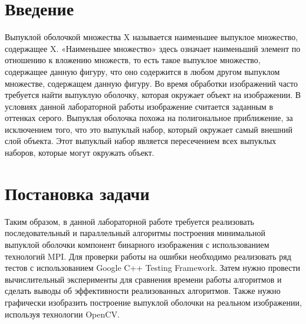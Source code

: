 \documentclass{report}
\begin{document}
\setcounter{page}{2}

\tableofcontents
\newpage

\section*{Введение}
\par Выпуклой оболочкой множества X называется наименьшее выпуклое множество, содержащее X. «Наименьшее множество» здесь означает наименьший элемент по отношению к вложению множеств, то есть такое выпуклое множество, содержащее данную фигуру, что оно содержится в любом другом выпуклом множестве, содержащем данную фигуру. Во время обработки изображений часто требуется найти выпуклую оболочку, которая окружает объект на изображении. В условиях данной лабораторной работы изображение считается заданным в оттенках серого. Выпуклая оболочка похожа на полигональное приближение, за исключением того, что это выпуклый набор, который окружает самый внешний слой объекта. Этот выпуклый набор является пересечением всех выпуклых наборов, которые могут окружать объект. 
\newpage

\section*{Постановка задачи}
\par Таким образом, в данной лабораторной работе требуется реализовать последовательный и параллельный алгоритмы построения минимальной выпуклой оболочки компонент бинарного изображения с использованием технологий MPI. Для проверки работы на ошибки необходимо реализовать ряд тестов с использованием Google C++ Testing Framework. Затем нужно провести вычислительный эксперименты для сравнения времени работы алгоритмов и сделать выводы об эффективности реализованных алгоритмов. Также нужно графически изобразить построение выпуклой оболочки на реальном изображении, используя технологии OpenCV.
\newpage

\end{document}
